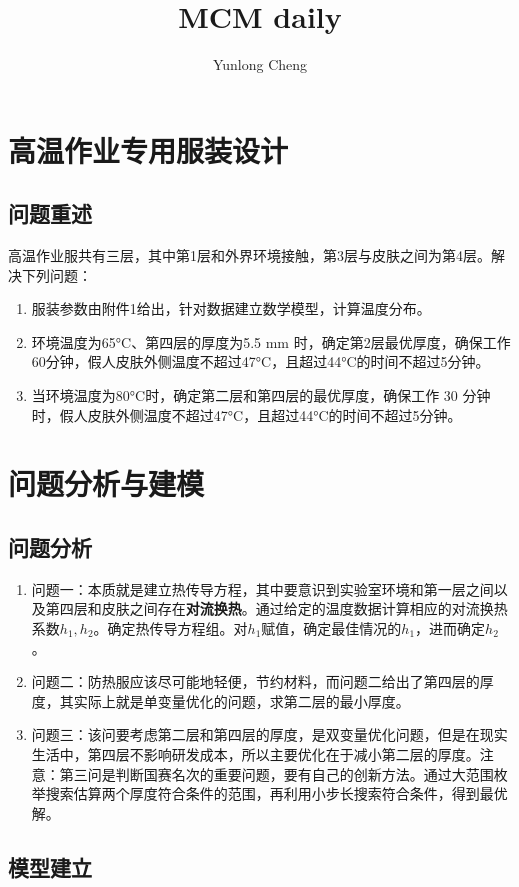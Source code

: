 \documentclass[12pt,a4paper]{article}
\title{MCM daily}
\author{Yunlong Cheng}
\begin{document}
\maketitle
\section{高温作业专用服装设计}
\subsection{问题重述}
高温作业服共有三层，其中第1层和外界环境接触，第3层与皮肤之间为第4层。解决下列问题：
\begin{enumerate}
  \item 服装参数由附件1给出，针对数据建立数学模型，计算温度分布。
  \item 环境温度为65°C、第四层的厚度为5.5 mm 时，确定第2层最优厚度，确保工作60分钟，假人皮肤外侧温度不超过47°C，且超过44°C的时间不超过5分钟。
  \item 当环境温度为80°C时，确定第二层和第四层的最优厚度，确保工作 30 分钟时，假人皮肤外侧温度不超过47°C，且超过44°C的时间不超过5分钟。
\end{enumerate}

\section{问题分析与建模}
\subsection{问题分析}
\begin{enumerate}
  \item 问题一：本质就是建立热传导方程，其中要意识到实验室环境和第一层之间以及第四层和皮肤之间存在\textbf{对流换热}。通过给定的温度数据计算相应的对流换热系数$h_1,h_2$。确定热传导方程组。对$h_1$赋值，确定最佳情况的$h_1$，进而确定$h_2$。
  \item 问题二：防热服应该尽可能地轻便，节约材料，而问题二给出了第四层的厚度，其实际上就是单变量优化的问题，求第二层的最小厚度。
  \item 问题三：该问要考虑第二层和第四层的厚度，是双变量优化问题，但是在现实生活中，第四层不影响研发成本，所以主要优化在于减小第二层的厚度。注意：第三问是判断国赛名次的重要问题，要有自己的创新方法。通过大范围枚举搜索估算两个厚度符合条件的范围，再利用小步长搜索符合条件，得到最优解。
\end{enumerate}
\subsection{模型建立}
\end{document}
